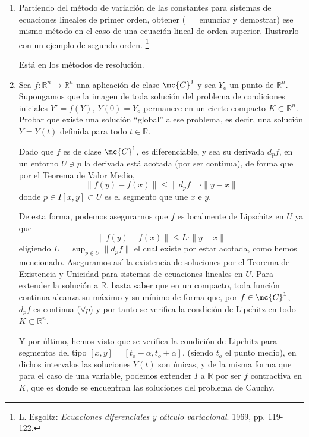 \begin{enumerate}
\item \justifying  Partiendo del método de variación de las constantes para sistemas de ecuaciones lineales de primer orden, obtener ($=$ enunciar y demostrar) ese mismo método en el caso de una ecuación lineal de orden superior. Ilustrarlo con un ejemplo de segundo orden. \footnote{L. Esgoltz: \textit{Ecuaciones diferenciales y cálculo variacional}. 1969, pp. 119-122.}
\begin{sol}
Está en los métodos de resolución.
\end{sol}

\item \justifying Sea $f : \mathbb R^n \longrightarrow \mathbb R^n$ una aplicación de clase $\mc{C}^1$ y sea $Y_o$ un punto de $\mathbb R^n$. Supongamos que la imagen de toda solución del problema de
condiciones iniciales $Y' = f(Y ), \: Y (0) = Y_o$ permanece en un cierto compacto $K \subset \mathbb R^n$. Probar que existe una solución ``global'' a ese problema, es decir, una solución $Y = Y (t)$ definida para todo $t \in \mathbb R$.
\begin{sol}
    Dado que $f$ es de clase $\mc{C}^1$, es diferenciable, y sea su derivada $d_pf$, en un entorno $U \ni p$ la derivada está acotada (por ser continua), de forma que por el Teorema de Valor Medio, 
    $$\|f(y)-f(x)\|\leq \| d_pf \|\cdot  \|y-x\|$$
    donde $p \in I[x,y] \subset U$ es el segmento que une $x$ e $y$. 

    De esta forma, podemos asegurarnos que $f$ es localmente de Lipschitz en $U$ ya que 
    $$\|f(y)-f(x)\|\leq L \cdot   \|y-x\|$$
    eligiendo $\displaystyle L=\sup_{p \in U} \|d_pf\|$ el cual existe por estar acotada, como hemos mencionado. Aseguramos así la existencia de soluciones por el Teorema de Existencia y Unicidad para sistemas de ecuaciones lineales en $U$. Para extender la solución a $\mathbb R$, basta saber que en un compacto, toda función continua alcanza su máximo y su mínimo de forma que, por $f \in \mc{C}^1$, $d_pf$ es continua ($\forall p$) y por tanto se verifica la condición de Lipchitz en todo $K \subset \mathbb R^n$. 

    Y por último, hemos visto que se verifica la condición de Lipchitz para segmentos del tipo $[x,y]=[t_o-\alpha,t_o+\alpha]$, (siendo $t_o$ el punto medio), en dichos intervalos las soluciones $Y(t)$ son únicas, y de la misma forma que para el caso de una variable, podemos extender $I$ a $\mathbb R$ por ser $f$ contractiva en $K$, que es donde se encuentran las soluciones del problema de Cauchy.  
\end{sol}
\end{enumerate}